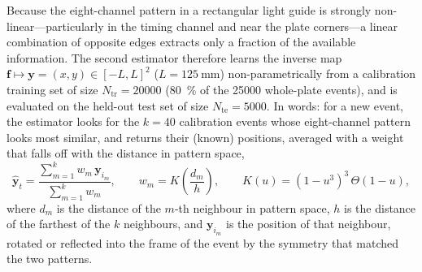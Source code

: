 \documentclass[11pt,a4paper]{article}
\begin{document}
Because the eight-channel pattern in a rectangular light guide is strongly
non-linear---particularly in the timing channel and near the plate corners---a
linear combination of opposite edges extracts only a fraction of the available
information.  The second estimator therefore learns the inverse map
$\mathbf{f} \mapsto \mathbf{y} = (x,y)\in[-L,L]^2$ ($L=\SI{125}{\milli\meter}$)
non-parametrically from a calibration training set of size
$N_{\mathrm{tr}}=\num{20000}$ (\SI{80}{\percent} of the \num{25000} whole-plate
events), and is evaluated on the held-out test set of size
$N_{\mathrm{te}}=\num{5000}$.  In words: for a new event, the estimator looks
for the $k=40$ calibration events whose eight-channel pattern looks most
similar, and returns their (known) positions, averaged with a weight that
falls off with the distance in pattern space,
\begin{equation}
  \hat{\mathbf{y}}_t
  = \frac{\sum_{m=1}^{k} w_m\,\mathbf{y}_{i_m}}{\sum_{m=1}^{k} w_m},
  \qquad
  w_m = K\!\left(\frac{d_m}{h}\right),
  \qquad
  K(u) = (1 - u^3)^3\,\Theta(1 - u),
  \label{eq:knn-simple}
\end{equation}
where $d_m$ is the distance of the $m$-th neighbour in pattern space, $h$ is
the distance of the farthest of the $k$ neighbours, and $\mathbf{y}_{i_m}$ is
the position of that neighbour, rotated or reflected into the frame of the
event by the symmetry that matched the two patterns.
\end{document}
